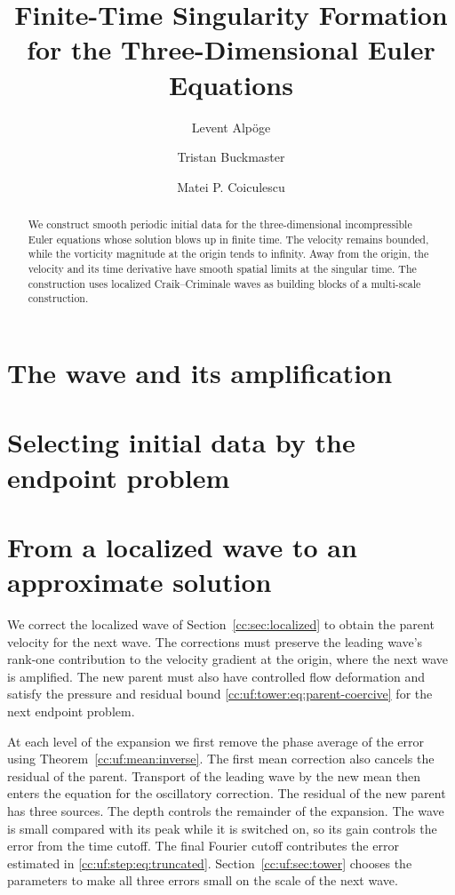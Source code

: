 \documentclass[11pt]{amsart}
\title[Singularity Formation for the Three-Dimensional Euler Equations]{Finite-Time Singularity Formation\\for the Three-Dimensional Euler Equations}
\author{Levent Alp\"oge}
\author{Tristan Buckmaster}
\author{Matei P. Coiculescu}
\date{}
\numberwithin{equation}{section}
\begin{document}
\raggedbottom
\begin{abstract}
We construct smooth periodic initial data for the three-dimensional
incompressible Euler equations whose solution blows up in finite time.
The velocity remains bounded, while the vorticity magnitude at the origin
tends to infinity. Away from the origin, the velocity and its time derivative
have smooth spatial limits at the singular time. The construction uses
localized Craik--Criminale waves as building blocks of a multi-scale construction.
\end{abstract}
\maketitle
\setcounter{tocdepth}{1}
\tableofcontents




\section{The wave and its amplification}\label{cc:sec:waves}



\section{Selecting initial data by the endpoint problem}\label{cc:sec:endpoint}

\section{From a localized wave to an approximate solution}\label{cc:sec:exact}
We correct the localized wave of Section~\ref{cc:sec:localized} to obtain
the parent velocity for the next wave. The corrections must preserve the
leading wave's rank-one contribution to the velocity gradient at the
origin, where the next wave is amplified. The new parent must also have
controlled flow deformation and satisfy the pressure and residual bound
\eqref{cc:uf:tower:eq:parent-coercive} for the next endpoint problem.

At each level of the expansion we first remove the phase average of the
error using Theorem~\ref{cc:uf:mean:inverse}. The first mean correction
also cancels the residual of the parent. Transport of the leading wave
by the new mean then enters the equation for the oscillatory correction.
The residual of the new parent has three sources. The depth controls the
remainder of the expansion. The wave is small compared with its peak
while it is switched on, so its gain controls the error from the time
cutoff. The final Fourier cutoff contributes the error estimated in
\eqref{cc:uf:step:eq:truncated}. Section~\ref{cc:uf:sec:tower} chooses
the parameters to make all three errors small on the scale of the next
wave.
\end{document}
